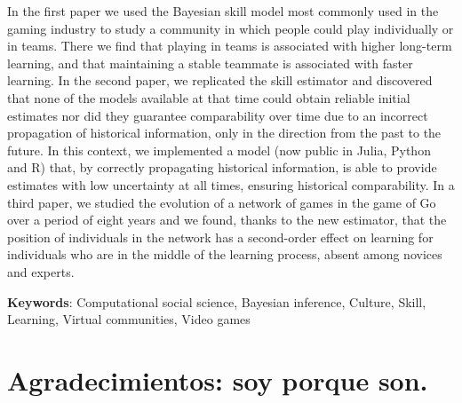 \documentclass[a4paper,11pt]{book}
\theoremstyle{definition}
\begin{document}

In the first paper we used the Bayesian skill model most commonly used in the gaming industry to study a community in which people could play individually or in teams.
There we find that playing in teams is associated with higher long-term learning, and that maintaining a stable teammate is associated with faster learning.
In the second paper, we replicated the skill estimator and discovered that none of the models available at that time could obtain reliable initial estimates nor did they guarantee comparability over time due to an incorrect propagation of historical information, only in the direction from the past to the future.
In this context, we implemented a model (now public in Julia, Python and R) that, by correctly propagating historical information, is able to provide estimates with low uncertainty at all times, ensuring historical comparability.
In a third paper, we studied the evolution of a network of games in the game of Go over a period of eight years and we found, thanks to the new estimator, that the position of individuals in the network has a second-order effect on learning for individuals who are in the middle of the learning process, absent among novices and experts.
%
\vspace{0.1cm}

\noindent \textbf{Keywords}: Computational social science, Bayesian inference, Culture, Skill, Learning, Virtual communities, Video games

\normalsize

\tableofcontents

\newpage

\vfill


\normalsize

\chapter{Agradecimientos: soy porque son.}
\end{document}
